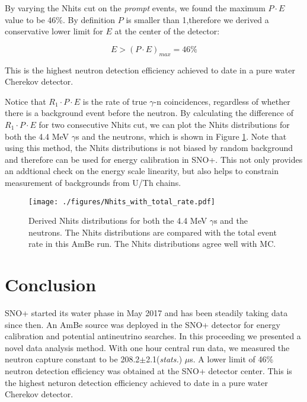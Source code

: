 \documentclass[a4paper]{jpconf}
\begin{document}
By varying the Nhits cut on the \textit{prompt} events, we found the maximum $P \cdot E$ value to be 46\%. By definition $P$ is smaller than 1,therefore we derived a conservative lower limit for $E$ at the center of the detector:

\begin{equation}
E > (P \cdot E)_{max} = 46\%
\end{equation}

This is the highest neutron detection efficiency achieved to date in a pure water Cherekov detector.

Notice that $R_1 \cdot P \cdot E$ is the rate of true $\gamma$-n coincidences, regardless of whether there is a background event before the neutron. By calculating the difference of $R_1 \cdot P \cdot E$ for two consecutive Nhits cut, we can plot the Nhits distributions for both the 4.4 MeV $\gamma$s and the neutrons, which is shown in Figure \ref{fig:4}. Note that using this method, the Nhits distributions is not biased by random background and therefore can be used for energy calibration in SNO+. This not only provides an addtional check on the energy scale linearity, but also helps to constrain measurement of backgrounds from U/Th chains. 

\begin{figure}[h]
\begin{center}
\texttt{[image: ./figures/Nhits\_with\_total\_rate.pdf]}
\end{center}
\caption{\label{fig:4}Derived Nhits distributions for both the 4.4 MeV $\gamma$s and the neutrons. The Nhits distributions are compared with the total event rate in this AmBe run. The Nhits distributions agree well with MC.}
\end{figure}

\section{Conclusion}

SNO+ started its water phase in May 2017 and has been steadily taking data since then. An AmBe source was deployed in the SNO+ detector for energy calibration and potential antineutrino searches. In this proceeding we presented a novel data analysis method. With one hour central run data, we measured the neutron capture constant to be 208.2$\pm$2.1(\textit{stats.}) $\mu$s. A lower limit of 46\% neutron detection efficiency was obtained at the SNO+ detector center. This is the highest neturon detection efficiency achieved to date in a pure water Cherekov detector. 
\end{document}
